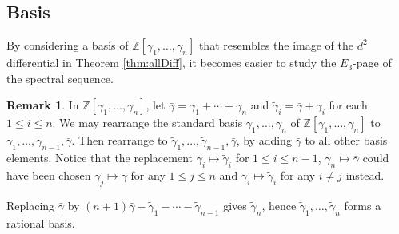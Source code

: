 \documentclass{article}
\theoremstyle{plain}
\theoremstyle{definition}
\newtheorem{rmk}[thm]{Remark}
\numberwithin{thm}{section}
\begin{document}
			
		\subsection{Basis}\label{sec:basis}
			
			By considering a basis of $\mathbb{Z}[\gamma_1,\dots,\gamma_n]$ that resembles the image of the $d^2$ differential in Theorem \ref{thm:allDiff},
			it becomes easier to study the $E_3$-page of the spectral sequence.
			
			\begin{rmk}\label{rmk:TildeBasis}
				In $\mathbb{Z}[\gamma_1,\dots,\gamma_{n}]$, let $\bar{\gamma}=\gamma_1+\cdots+\gamma_n$ and $\tilde{\gamma}_i=\bar{\gamma}+\gamma_i$ for each $1\leq i\leq n$. 
				We may rearrange the standard basis $\gamma_1,\dots,\gamma_n$ of $\mathbb{Z}[\gamma_1,\dots,\gamma_{n}]$ to $\gamma_1,\dots,\gamma_{n-1},\bar{\gamma}$.
				Then rearrange to $\tilde{\gamma}_1,\dots,\tilde{\gamma}_{n-1},\bar{\gamma}$,
				by adding $\bar{\gamma}$ to all other basis elements.
				Notice that the replacement $\gamma_i \mapsto \tilde{\gamma}_i$ for $1\leq i \leq n-1$, $\gamma_n \mapsto \bar{\gamma}$
				could have been chosen $\gamma_j \mapsto \bar{\gamma}$ for any $1\leq j \leq n$ and $\gamma_i \mapsto \tilde{\gamma}_i$ for any $i\neq j$ instead.
				
				Replacing $\bar{\gamma}$ by $(n+1)\bar{\gamma}-\tilde{\gamma}_1-\cdots-\tilde{\gamma}_{n-1}$ gives $\tilde{\gamma}_n$, 
				hence $\tilde{\gamma}_1,\dots,\tilde{\gamma}_{n}$ forms a rational basis.
			\end{rmk}
			
\end{document}
